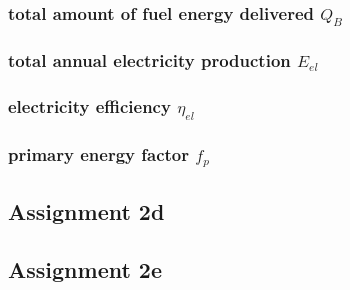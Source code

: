 \documentclass{article}
\begin{document}
		\subsubsection*{total amount of fuel energy delivered $Q_B$}

		\subsubsection*{total annual electricity production $E_{el}$}

		\subsubsection*{electricity efficiency $\eta_{el}$}

		\subsubsection*{primary energy factor $f_p$}

	\newpage
	\subsection*{Assignment 2d}

	\newpage
	\subsection*{Assignment 2e}
\end{document}
